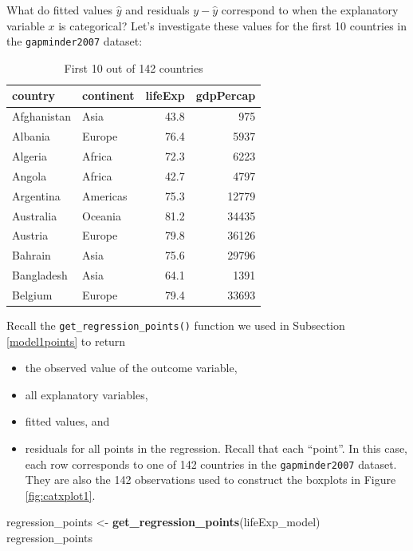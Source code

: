 \documentclass[12pt,]{krantz}
\makeatletter
\newenvironment{Shaded}{\begin{snugshade}}{\end{snugshade}}
\newcommand{\KeywordTok}[1]{\textcolor[rgb]{0.27,0.27,0.27}{\textbf{#1}}}
\newcommand{\StringTok}[1]{\textcolor[rgb]{0.5,0.5,0.5}{#1}}
\newcommand{\NormalTok}[1]{#1}
\providecommand{\tightlist}{%
  \setlength{\itemsep}{0pt}\setlength{\parskip}{0pt}}
\newenvironment{kframe}{%
\medskip{}
\setlength{\fboxsep}{.8em}
 \def\at@end@of@kframe{}%
 \ifinner\ifhmode%
  \def\at@end@of@kframe{\end{minipage}}%
  \begin{minipage}{\columnwidth}%
 \fi\fi%
 \def\FrameCommand##1{\hskip\@totalleftmargin \hskip-\fboxsep
 \colorbox{shadecolor}{##1}\hskip-\fboxsep
     \hskip-\linewidth \hskip-\@totalleftmargin \hskip\columnwidth}%
 \MakeFramed {\advance\hsize-\width
   \@totalleftmargin\z@ \linewidth\hsize
   \@setminipage}}%
 {\par\unskip\endMakeFramed%
 \at@end@of@kframe}
\renewenvironment{Shaded}{\begin{kframe}}{\end{kframe}}
\theoremstyle{definition}
\theoremstyle{definition}
\theoremstyle{definition}
\theoremstyle{remark}
\makeatother
\begin{document}
What do fitted values \(\widehat{y}\) and residuals \(y - \widehat{y}\)
correspond to when the explanatory variable \(x\) is categorical? Let's
investigate these values for the first 10 countries in the
\texttt{gapminder2007} dataset:

\begin{table}[H]

\caption{\label{tab:unnamed-chunk-199}First 10 out of 142 countries}
\centering
\fontsize{10}{12}\selectfont
\begin{tabular}[t]{llrr}
\toprule
country & continent & lifeExp & gdpPercap\\
\midrule
Afghanistan & Asia & 43.8 & 975\\
Albania & Europe & 76.4 & 5937\\
Algeria & Africa & 72.3 & 6223\\
Angola & Africa & 42.7 & 4797\\
Argentina & Americas & 75.3 & 12779\\
\addlinespace
Australia & Oceania & 81.2 & 34435\\
Austria & Europe & 79.8 & 36126\\
Bahrain & Asia & 75.6 & 29796\\
Bangladesh & Asia & 64.1 & 1391\\
Belgium & Europe & 79.4 & 33693\\
\bottomrule
\end{tabular}
\end{table}

Recall the \texttt{get\_regression\_points()} function we used in
Subsection \ref{model1points} to return

\begin{itemize}
\tightlist
\item
  the observed value of the outcome variable,
\item
  all explanatory variables,
\item
  fitted values, and
\item
  residuals for all points in the regression. Recall that each
  ``point''. In this case, each row corresponds to one of 142 countries
  in the \texttt{gapminder2007} dataset. They are also the 142
  observations used to construct the boxplots in Figure
  \ref{fig:catxplot1}.
\end{itemize}

\begin{Shaded}
\begin{Highlighting}[]
\NormalTok{regression_points <-}\StringTok{ }\KeywordTok{get_regression_points}\NormalTok{(lifeExp_model)}
\NormalTok{regression_points}
\end{Highlighting}
\end{Shaded}
\end{document}
